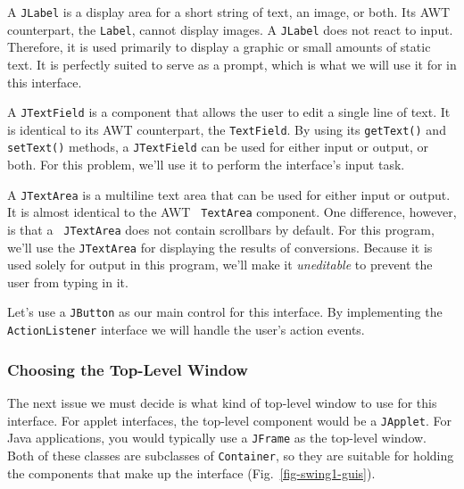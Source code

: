 \begin{BL}

\item  A {\tt JLabel} is a display area for a short string of text,  an
image, or both.  Its AWT counterpart, the {\tt Label}, cannot display
images.  A \mbox{\tt JLabel} does not react to input.  Therefore, it is used
primarily to display a graphic or small amounts of static text.  It is
perfectly suited to serve as a prompt, which is what we will use it
for in this interface.

\item  A {\tt JTextField} is a component that allows the user to edit
a single line of text.  It is identical to its AWT counterpart,
the {\tt TextField}. By using its {\tt getText()} and {\tt setText()}
methods, a {\tt JTextField} can be used for either input or output, or
both.  For this problem, we'll use it to perform the interface's input
task.

\item A {\tt JTextArea} is a multiline text area that can be used for
either input or output.  It is almost identical to the AWT {\tt
TextArea} component.  One difference, however, is that a {\tt
JTextArea} does not contain scrollbars by default.  For this program,
we'll use the {\tt JTextArea} for displaying the results of
conversions.  Because it is used solely for output in this program,
we'll make it {\it uneditable} to prevent the user from typing in it.

\item  Let's use a {\tt JButton} as our main
control for this interface.  By implementing the {\tt ActionListener}
interface we will handle the user's action events.

\end{BL}

\subsubsection*{Choosing the Top-Level Window}
\noindent The next issue we must decide is what kind of top-level
window to use for this interface.  For applet interfaces, the top-level
component would be a {\tt JApplet}.  For Java applications, you would
typically use a {\tt JFrame} as the top-level window.  Both of these
classes are subclasses of {\tt Container}, so they are suitable for
holding the components that make up the interface
(Fig.~\ref{fig-swing1-guis}).


